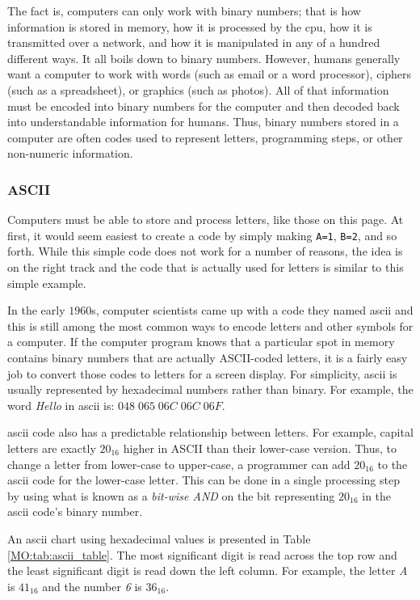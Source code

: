 The fact is, computers can only work with binary numbers; that is how information is stored in memory, how it is processed by the \gls{cpu}, how it is transmitted over a network, and how it is manipulated in any of a hundred different ways. It all boils down to binary numbers. However, humans generally want a computer to work with words (such as email or a word processor), ciphers (such as a spreadsheet), or graphics (such as photos). All of that information must be encoded into binary numbers for the computer and then decoded back into understandable information for humans. Thus, binary numbers stored in a computer are often codes used to represent letters, programming steps, or other non-numeric information. 

\subsubsection{ASCII}
\label{MO:subsub:ascii}

Computers must be able to store and process letters, like those on this page. At first, it would seem easiest to create a code by simply making \lstinline[columns=fixed]|A=1|, \lstinline[columns=fixed]|B=2|, and so forth. While this simple code does not work for a number of reasons, the idea is on the right track and the code that is actually used for letters is similar to this simple example. 

In the early $ 1960 $s, computer scientists came up with a code they named \gls{ascii} and this is still among the most common ways to encode letters and other symbols for a computer. If the computer program knows that a particular spot in memory contains binary numbers that are actually ASCII-coded letters, it is a fairly easy job to convert those codes to letters for a screen display. For simplicity, \gls{ascii} is usually represented by hexadecimal numbers rather than binary. For example, the word \emph{Hello} in \gls{ascii} is: $ 048 \; 065 \; 06C \; 06C \; 06F $.

\gls{ascii} code also has a predictable relationship between letters. For example, capital letters are exactly $ 20_{16} $ higher in ASCII than their lower-case version. Thus, to change a letter from lower-case to upper-case, a programmer can add $ 20_{16} $ to the \gls{ascii} code for the lower-case letter. This can be done in a single processing step by using what is known as a \emph{bit-wise \textsf{AND}} on the bit representing $ 20_{16} $ in the \gls{ascii} code's binary number.

An \gls{ascii} chart using hexadecimal values is presented in Table \ref{MO:tab:ascii_table}. The most significant digit is read across the top row and the least significant digit is read down the left column. For example, the letter \emph{A} is $ 41_{16} $ and the number \emph{6} is $ 36_{16} $.

